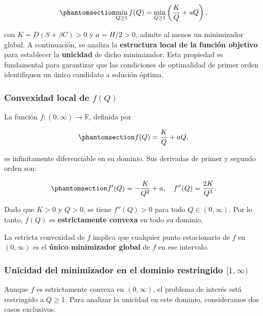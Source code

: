 \documentclass[
  spanish,
  us-letterpaper,
]{scrreprt}
\numberwithin{equation}{section}
\begin{document}
\begin{equation}\phantomsection\label{eq-prob_25_2}{
\min_{Q \geq 1} f(Q) = \min_{Q \geq 1} \left( \frac{K}{Q} + a Q \right),
}\end{equation}

con \(K = D(S + \beta C) > 0\) y \(a = H/2 > 0\), admite al menos un
minimizador global. A continuación, se analiza la \textbf{estructura
local de la función objetivo} para establecer la \textbf{unicidad} de
dicho minimizador. Esta propiedad es fundamental para garantizar que las
condiciones de optimalidad de primer orden identifiquen un único
candidato a solución óptima.

\subsubsection{\texorpdfstring{Convexidad local de
\(f(Q)\)}{Convexidad local de f(Q)}}\label{convexidad-local-de-fq}

La función \(f : (0, \infty) \to \mathbb{R}\), definida por

\begin{equation}\phantomsection\label{eq-fQ_25_3}{
f(Q) = \frac{K}{Q} + a Q,
}\end{equation}

es infinitamente diferenciable en su dominio. Sus derivadas de primer y
segundo orden son:

\begin{equation}\phantomsection\label{eq-fpp_25_3}{
f'(Q) = -\frac{K}{Q^2} + a,
\quad
f''(Q) = \frac{2K}{Q^3}.
}\end{equation}

Dado que \(K > 0\) y \(Q > 0\), se tiene \(f''(Q) > 0\) para todo
\(Q \in (0, \infty)\). Por lo tanto, \(f(Q)\) es \textbf{estrictamente
convexa} en todo su dominio.

La estricta convexidad de \(f\) implica que cualquier punto estacionario
de \(f\) en \((0, \infty)\) es el \textbf{único minimizador global} de
\(f\) en ese intervalo.

\subsubsection{\texorpdfstring{Unicidad del minimizador en el dominio
restringido
\([1, \infty)\)}{Unicidad del minimizador en el dominio restringido {[}1, \textbackslash infty)}}\label{unicidad-del-minimizador-en-el-dominio-restringido-1-infty}

Aunque \(f\) es estrictamente convexa en \((0, \infty)\), el problema de
interés está restringido a \(Q \geq 1\). Para analizar la unicidad en
este dominio, consideramos dos casos exclusivos:
\end{document}
